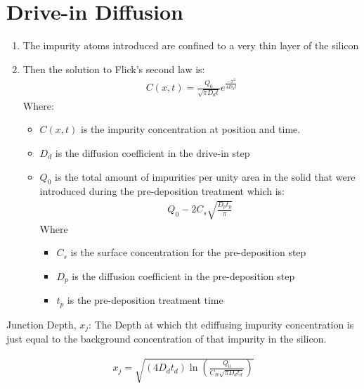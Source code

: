 \documentclass{article}
\begin{document}
\section{Drive-in Diffusion}
\begin{enumerate}
    \item The impurity atoms introduced are confined to a very thin layer of the silicon
    \item Then the solution to Flick's second law is:
    \begin{equation}
        \begin{split}
            C(x,t) = \frac{Q_0}{\sqrt{\pi D_d t}}e^{\frac{-x^2}{4D_d t}}
        \end{split}
    \end{equation}
    Where:
    \begin{itemize}
        \item $C(x,t)$ is the impurity concentration at position and time.
        \item $D_d$ is the diffusion coefficient in the drive-in step
        \item $Q_0$ is the total amount of impurities per unity area in the solid that were introduced during the pre-deposition treatment which is:
        \begin{equation}
            \begin{split}
                Q_0 - 2 C_s \sqrt{\frac{D_p t_p}{\pi}}
            \end{split}
        \end{equation}
        Where
        \begin{itemize}
            \item $C_s$ is the surface concentration for the pre-deposition step
            \item $D_p$ is the diffusion coefficient in the pre-deposition step
            \item $t_p$ is the pre-deposition treatment time
        \end{itemize}
    \end{itemize}
\end{enumerate}


Junction Depth, $x_j$: The Depth at which tht ediffusing impurity concentration is just equal to the background concentration of that impurity in the silicon.

\begin{equation}
    \begin{split}
        x_j = \sqrt{(4D_d t_d)\ln(\frac{Q_0}{C_B \sqrt{\pi D_d t_d}})}
    \end{split}
\end{equation}
\end{document}

